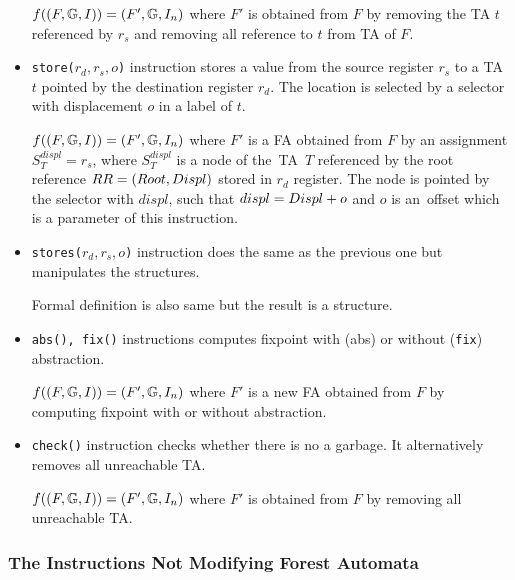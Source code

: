 \begin{itemize}
		$f((F, \mathbb{G}, I)) = (F', \mathbb{G}, I_n)$
		where $F'$ is obtained from $F$ by removing the TA $t$ referenced
		by $r_s$ and removing all reference to $t$ from TA of $F$.

	\item {\tt store($r_d,r_s,o$)} instruction stores a value from the source register $r_s$
		to a TA $t$ pointed by the destination register $r_d$.
		The location is selected by a selector with displacement $o$ in a label of $t$.
		
		$f((F, \mathbb{G}, I)) = (F', \mathbb{G}, I_n)$
		where $F'$ is a FA obtained from $F$ by an assignment
		$S_{T}^{displ} = r_{s}$,
		where $S_{T}^{displ}$  is a node of the~TA~$T$
		referenced by the root reference $RR=(Root,Displ)$ stored in $r_d$ register.
		The node is pointed by the selector with $displ$, such that
		$displ=Displ + o$ and
		$o$ is an~offset which is a parameter of this instruction.
	
	\item {\tt stores($r_d,r_s,o$)} instruction does the same as the previous
		one but manipulates the structures.
		
		Formal definition is also same but the result is a structure.

	\item {\tt abs(), fix()} instructions computes fixpoint with (abs) or
		without ({\tt fix}) abstraction.
		
		$f((F, \mathbb{G}, I)) = (F', \mathbb{G}, I_n)$
		where $F'$ is a new FA obtained from $F$ by computing fixpoint with or without abstraction.

	\item {\tt check()} instruction checks whether there is no a garbage.
		It alternatively removes all unreachable TA.
		
		$f((F, \mathbb{G}, I)) = (F', \mathbb{G}, I_n)$
		where $F'$ is obtained from $F$ by removing all unreachable
		TA.

\end{itemize}

\subsubsection{The Instructions Not Modifying Forest Automata}

